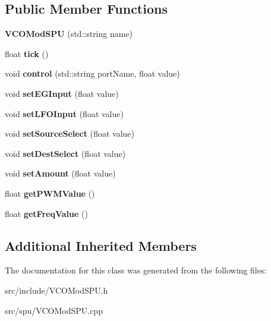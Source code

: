 \subsection*{Public Member Functions}
\begin{DoxyCompactItemize}
\item 
\hypertarget{classVCOModSPU_ae11ac554564dbae51b4f7d1a19f63dfc}{{\bfseries V\-C\-O\-Mod\-S\-P\-U} (std\-::string name)}\label{classVCOModSPU_ae11ac554564dbae51b4f7d1a19f63dfc}

\item 
\hypertarget{classVCOModSPU_a92982b411ee6a7d31eafa71678be6b63}{float {\bfseries tick} ()}\label{classVCOModSPU_a92982b411ee6a7d31eafa71678be6b63}

\item 
\hypertarget{classVCOModSPU_a300bde3f99008ce0b8a4ff38dc8c3201}{void {\bfseries control} (std\-::string port\-Name, float value)}\label{classVCOModSPU_a300bde3f99008ce0b8a4ff38dc8c3201}

\item 
\hypertarget{classVCOModSPU_afecf559bef09d7b469e3ebedddd05866}{void {\bfseries set\-E\-G\-Input} (float value)}\label{classVCOModSPU_afecf559bef09d7b469e3ebedddd05866}

\item 
\hypertarget{classVCOModSPU_a049f415e96c81b6dd63f99c7cc8fe35d}{void {\bfseries set\-L\-F\-O\-Input} (float value)}\label{classVCOModSPU_a049f415e96c81b6dd63f99c7cc8fe35d}

\item 
\hypertarget{classVCOModSPU_af1e0d57fcd491271ce0775bad41c168a}{void {\bfseries set\-Source\-Select} (float value)}\label{classVCOModSPU_af1e0d57fcd491271ce0775bad41c168a}

\item 
\hypertarget{classVCOModSPU_aaad0c1644bb9d44c33929fdb5c7a7ce2}{void {\bfseries set\-Dest\-Select} (float value)}\label{classVCOModSPU_aaad0c1644bb9d44c33929fdb5c7a7ce2}

\item 
\hypertarget{classVCOModSPU_a5c2f54cbe8e3d6a5bedd55783054da83}{void {\bfseries set\-Amount} (float value)}\label{classVCOModSPU_a5c2f54cbe8e3d6a5bedd55783054da83}

\item 
\hypertarget{classVCOModSPU_ad2434524030667ff7662bf4c0733cc77}{float {\bfseries get\-P\-W\-M\-Value} ()}\label{classVCOModSPU_ad2434524030667ff7662bf4c0733cc77}

\item 
\hypertarget{classVCOModSPU_ac1fef0a06f8362f8c723260cd3c6f0c2}{float {\bfseries get\-Freq\-Value} ()}\label{classVCOModSPU_ac1fef0a06f8362f8c723260cd3c6f0c2}

\end{DoxyCompactItemize}
\subsection*{Additional Inherited Members}


The documentation for this class was generated from the following files\-:\begin{DoxyCompactItemize}
\item 
src/include/V\-C\-O\-Mod\-S\-P\-U.\-h\item 
src/spu/V\-C\-O\-Mod\-S\-P\-U.\-cpp\end{DoxyCompactItemize}
